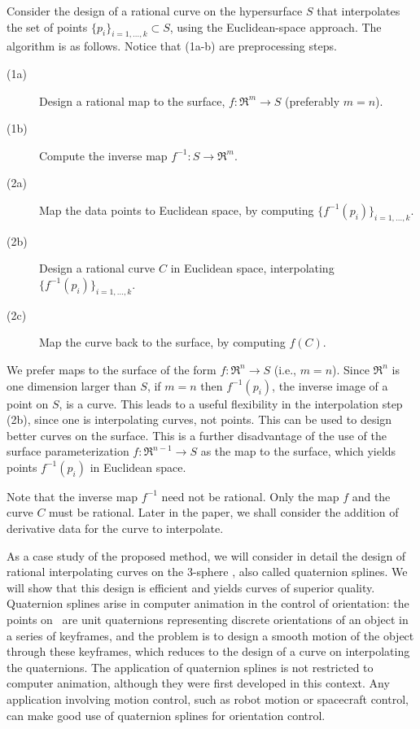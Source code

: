 Consider the design of a rational
curve on the hypersurface $S$ that interpolates the set of points 
$\{p_i\}_{i=1,\ldots,k} \subset S$, using the Euclidean-space approach.
The algorithm is as follows.
Notice that (1a-b) are preprocessing steps.
%
\begin{description}
\item[(1a)] Design a rational map to the surface, $f:\Re^m \rightarrow S$ (preferably $m=n$).
\item[(1b)] Compute the inverse map $f^{-1}:S \rightarrow \Re^m$.
\item[(2a)] Map the data points to Euclidean space, by computing $\{f^{-1}(p_i)\}_{i=1,\ldots,k}$.
\item[(2b)] Design a rational curve $C$ in Euclidean space, interpolating $\{f^{-1}(p_i)\}_{i=1,\ldots,k}$.
\item[(2c)] Map the curve back to the surface, by computing $f(C)$.
\end{description}

We prefer maps to the surface of the form $f:\Re^n \rightarrow S$ (i.e., $m=n$).
Since $\Re^n$ is one dimension larger than $S$,
if $m=n$ then $f^{-1}(p_i)$, the inverse image of a point on $S$, is a curve.
This leads to a useful flexibility in the interpolation step (2b),
since one is interpolating curves, not points.
This can be used to design better curves on the surface.
This is a further disadvantage of the use of the surface
parameterization $f:\Re^{n-1} \rightarrow S$ as the map to the surface,
which yields points $f^{-1}(p_i)$ in Euclidean space.

Note that the inverse map $f^{-1}$ need not be rational.
Only the map $f$ and the curve $C$ must be rational.
Later in the paper, we shall consider the addition of derivative data
for the curve to interpolate.

As a case study of the proposed method,
we will consider in detail the design of rational interpolating curves 
on the 3-sphere , also called quaternion splines.
We will show that this design is efficient and yields curves of superior
quality.
Quaternion splines arise in computer animation in the control of
orientation: the points on \ are unit quaternions representing
discrete orientations of an object in a series of keyframes,
and the problem is to design a smooth motion of the object through
these keyframes,
which reduces to the design of a curve on 
interpolating the quaternions.
The application of quaternion 
splines is not restricted to computer animation, although they were
first developed in this context.  
Any application involving motion control,
such as robot motion or spacecraft control, 
can make good use of quaternion splines for orientation control.

